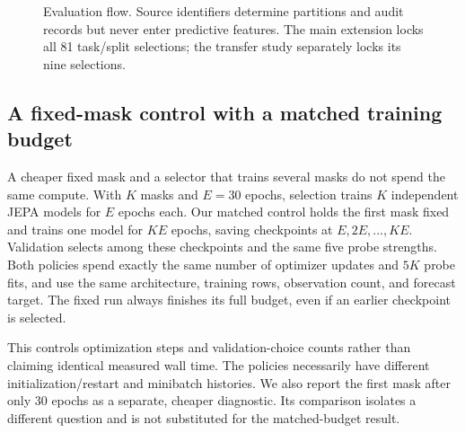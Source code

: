 \documentclass{article}
\begin{document}
\begin{figure}[t]
\centering
{}
\caption{Evaluation flow. Source identifiers determine partitions and audit records but never enter predictive features. The main extension locks all 81 task/split selections; the transfer study separately locks its nine selections.}
\label{fig:flow}
\end{figure}

\subsection{A fixed-mask control with a matched training budget}
A cheaper fixed mask and a selector that trains several masks do not spend the same compute. With $K$ masks and $E=30$ epochs, selection trains $K$ independent JEPA models for $E$ epochs each. Our matched control holds the first mask fixed and trains one model for $KE$ epochs, saving checkpoints at $E,2E,\ldots,KE$. Validation selects among these checkpoints and the same five probe strengths. Both policies spend exactly the same number of optimizer updates and $5K$ probe fits, and use the same architecture, training rows, observation count, and forecast target. The fixed run always finishes its full budget, even if an earlier checkpoint is selected.

This controls optimization steps and validation-choice counts rather than claiming identical measured wall time. The policies necessarily have different initialization/restart and minibatch histories. We also report the first mask after only 30 epochs as a separate, cheaper diagnostic. Its comparison isolates a different question and is not substituted for the matched-budget result.
\end{document}
